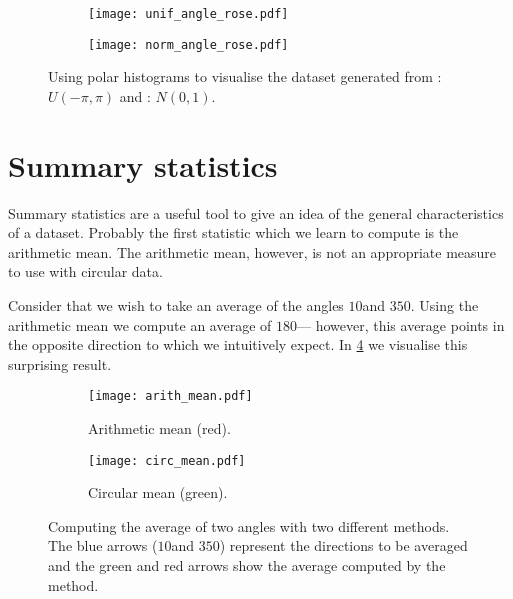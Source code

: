 \begin{figure}[!htbp]
	\begin{subfigure}[b]{0.4\textwidth}
		\hspace{-0.1\textwidth}
		\texttt{[image: unif\_angle\_rose.pdf]}
		\caption{}
		\label{subfig:unif_angle_rose}
	\end{subfigure}
	\hspace{0.1\textwidth}
	\begin{subfigure}[b]{0.4\textwidth}
		\texttt{[image: norm\_angle\_rose.pdf]}
		\caption{}
		\label{subfig:norm_angle_rose}
	\end{subfigure}
	\caption{Using polar histograms to visualise the dataset generated from : $U(-\pi,\pi)$ and : $N(0, 1)$.}
	\label{fig:angle_rose}
\end{figure}

\section{Summary statistics}
\label{sec:summary_stats}

Summary statistics are a useful tool to give an idea of the general characteristics of a dataset. Probably the first statistic which we learn to compute is the arithmetic mean. The arithmetic mean, however, is not an appropriate measure to use with circular data.

Consider that we wish to take an average of the angles $10$\textdegree and $350$\textdegree. Using the arithmetic mean we compute an average of $180$\textdegree --- however, this average points in the opposite direction to which we intuitively expect. In \cref{subfig:arith_mean} we visualise this surprising result.

\begin{figure}[!htbp]
	\begin{subfigure}[b]{0.4\textwidth}
		\hspace{-0.1\textwidth}
		\texttt{[image: arith\_mean.pdf]}
		\caption{Arithmetic mean (red).}
		\label{subfig:arith_mean}
	\end{subfigure}
	\hspace{0.1\textwidth}
	\begin{subfigure}[b]{0.4\textwidth}
		\texttt{[image: circ\_mean.pdf]}
		\caption{Circular mean (green).}
		\label{subfig:circ_mean}
	\end{subfigure}
	\caption{Computing the average of two angles with two different methods. The blue arrows ($10$\textdegree and $350$\textdegree) represent the directions to be averaged and the green and red arrows show the average computed by the method.}
	\label{fig:visualise_mean}
\end{figure}

